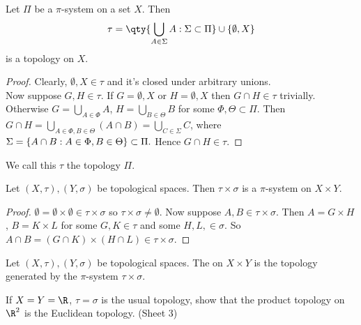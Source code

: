 \begin{proposition} \label{prp:37}
Let $\Pi$ be a $\pi$-system on a set $X$. Then 
\begin{align*}
    \tau = \qty{\bigcup_{A\in \Sigma} A : \Sigma \subset \Pi} \cup \set{\emptyset, X}
\end{align*} is a topology on $X$.
\end{proposition}  

\begin{proof}
Clearly, $\emptyset, X\in \tau$ and it's closed under arbitrary unions. \\
Now suppose $G,H \in \tau$.
If $G = \emptyset, X$ or $H = \emptyset, X$ then $G \cap H \in \tau$ trivially. \\
Otherwise $G = \bigcup_{A\in \Phi} A$, $H =\bigcup_{B \in \Theta} B$ for some $\Phi, \Theta \subset \Pi$.
Then $G \cap H = \bigcup_{A\in \Phi, B\in \Theta} (A \cap B) = \bigcup_{C \in \Sigma} C$, where $\Sigma = \{A \cap B : A\in \Phi, B\in \Theta\}\subset \Pi.$ Hence $G\cap H\in \tau$.
\end{proof}

\begin{definition}
We call this $\tau$ the topology  $\Pi$.
\end{definition}

\begin{proposition} \label{prp:38}
Let $(X,\tau), (Y,\sigma)$ be topological spaces. Then $\tau\times \sigma$ is a $\pi$-system on $X\times Y$.
\end{proposition}

\begin{proof}
$\emptyset = \emptyset \times \emptyset \in \tau\times \sigma$ so $\tau\times \sigma\neq \emptyset$. Now suppose $A,B\in\tau\times \sigma $. Then $A = G\times H$, $B=K\times L$ for some $G,K\in \tau$ and some $H,L,\in \sigma$. So $A\cap B = (G\cap K)\times (H\cap L) \in \tau\times \sigma$.
\end{proof}

\begin{definition}
Let $(X,\tau), (Y,\sigma)$ be topological spaces. The  on $X\times Y$ is the topology generated by the $\pi$-system $\tau \times \sigma$.
\end{definition}
\begin{exercise*}
If $X=Y=\R$, $\tau=\sigma$ is the usual topology, show that the product topology on $\R^2$ is the Euclidean topology. (Sheet 3)
\end{exercise*}

